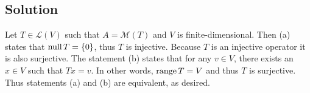 \documentclass{article}
\begin{document}
\subsection*{Solution}
Let $T\in\mathcal{L}(V)$ such that $A=\mathcal{M}(T)$ and $V$ is finite-dimensional. Then (a) states that $\text{null}\, T=\{0\}$, thus $T$ is injective. Because $T$ is an injective operator it is also surjective. The statement (b) states that for any $v\in V$, there exists an $x\in V$ such that $Tx=v$. In other words, $\text{range}\, T=V$ and thus $T$ is surjective. Thus statements (a) and (b) are equivalent, as desired.
\end{document}
